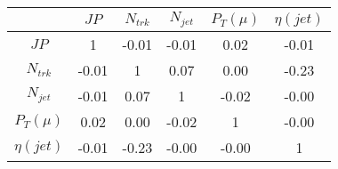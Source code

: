 \begin{tabular}{|c|c|c|c|c|c|} 
\hline
 & $JP$ & $N_{trk}$ & $N_{jet}$ & $P_{T} (\mu)$ & $\eta (jet)$ \\ \hline
$JP$ & 1 & -0.01 & -0.01 & 0.02 & -0.01 \\
$N_{trk}$ & -0.01 & 1 & 0.07 & 0.00 & -0.23 \\
$N_{jet}$ & -0.01 & 0.07 & 1 & -0.02 & -0.00 \\
$P_{T} (\mu)$ & 0.02 & 0.00 & -0.02 & 1 & -0.00 \\
$\eta (jet)$ & -0.01 & -0.23 & -0.00 & -0.00 & 1 \\
\hline 
\end{tabular} 


